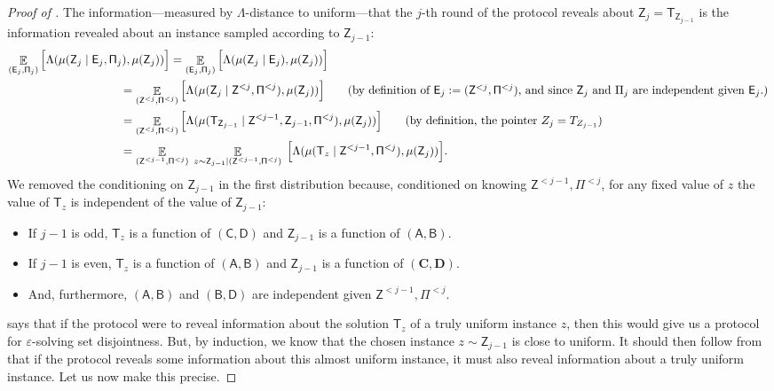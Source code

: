 \documentclass[11pt,letterpaper]{article}
\newcommand{\eps}{\varepsilon}
\DeclareMathOperator*{\E}{\mathbb{E}}
\theoremstyle{definition}
\newcommand{\rPi}{\rv{\Pi}}
\newcommand{\Bracket}[1]{\Big[#1\Big]}
\newcommand{\paren}[1]{\ensuremath{\mleft(#1\mright)}\xspace}
\newcommand{\Prot}{\ensuremath{\Pi}}
\newcommand{\bC}{\ensuremath{\bm{C}}}
\newcommand{\bD}{\ensuremath{\bm{D}}}
\newcommand{\rA}{\rv{A}}
\newcommand{\rB}{\rv{B}}
\newcommand{\rC}{\rv{C}}
\newcommand{\rD}{\rv{D}}
\newcommand{\rv}[1]{\ensuremath{\mathsf{#1}}}
\newcommand{\rZ}{\rv{Z}}
\newcommand{\rT}{\rv{T}}
\newcommand{\rE}{\rv{E}}
\newcommand{\rProt}{\rv{\Prot}}
\begin{document}
\begin{proof}[Proof of ]
The information---measured by $\Lambda$-distance to uniform---that the $j$-th round of the protocol reveals about $\rZ_j = \rT_{\rZ_{j-1}}$ is the information revealed about an instance sampled according to $\rZ_{j-1}$:
  \begin{align*}
		\E_{(\rE_j,\rProt_j)} \Bracket{\Lambda(\mu(\rZ_j \mid \rE_j,\rProt_j),\mu(\rZ_j))} &=\E_{(\rE_j,\rProt_j)} \Bracket{\Lambda(\mu(\rZ_j \mid \rE_j),\mu(\rZ_j))}\\
		&\hspace{-1.5cm}= \E_{(\rZ^{<j},\rProt^{<j})} \Bracket{\Lambda(\mu(\rZ_j \mid \rZ^{<j},\rProt^{<j}),\mu(\rZ_j))} \tag{by definition of $\rE_j := (\rZ^{<j},\rProt^{<j})$, and since $\rZ_j$ and $\Pi_j$ are independent given $\rE_j$.} \\
		&\hspace{-1.5cm}=\E_{(\rZ^{<j},\rProt^{<j})} \Bracket{\Lambda(\mu(\rT_{\rZ_{j-1}} \mid \rZ^{<j-1},\rZ_{j-1},\rProt^{<j}),\mu(\rZ_j))}\tag{by definition, the pointer $Z_j = T_{Z_{j-1}}$}\\
		&\hspace{-1.5cm}= \E_{(\rZ^{<j-1},\rProt^{<j})} \; \E_{z \sim \rZ_{j-1} \mid \paren{\rZ^{<j-1},\rProt^{<j}}}\; \Bracket{\Lambda(\mu(\rT_{z} \mid \rZ^{<j-1},\rProt^{<j}),\mu(\rZ_j))}.
	\end{align*}
	We removed the conditioning on $\rZ_{j-1}$ in the first distribution because, conditioned on knowing $\rZ^{<j-1},\Prot^{<j}$, for any fixed value of $z$ the value of $\rT_{z}$ is independent of the value of $\rZ_{j-1}$: \begin{itemize}
	    \item If $j-1$ is odd, $\rT_{z}$ is a function of  $(\rC,\rD)$ and $\rZ_{j-1}$ is a function of $(\rA,\rB)$.
            \item If $j-1$ is even, $\rT_{z}$ is a function of $(\rA,\rB)$ and $\rZ_{j-1}$ is a function of $(\bC,\bD)$.
            \item And, furthermore, $(\rA,\rB)$ and $(\rB,\rD)$ are independent given $\rZ^{<j-1}, \rPi^{<j}$. 
	\end{itemize}

    
	\medskip\noindent
     says that if the protocol were to reveal information about the solution $\rT_z$ of a truly uniform instance $z$, then this would give us a protocol for $\eps$-solving set disjointness. But, by induction, we know that the chosen instance $z \sim \rZ_{j-1}$ is close to uniform. It should then follow from  that if the protocol reveals some information about this almost uniform instance, it must also reveal information about a truly uniform instance. Let us now make this precise.
    

\end{proof}
\end{document}
